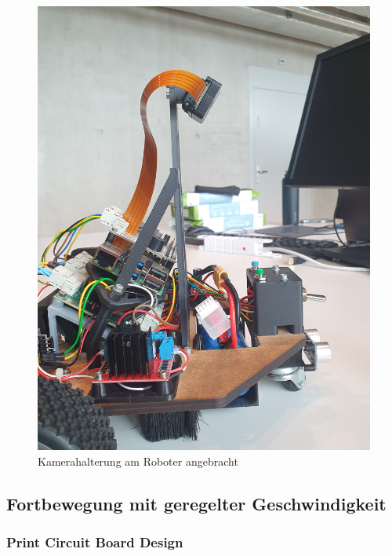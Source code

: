 \begin{figure}[H]
\begin{minipage}[b]{0.58\textwidth}
\end{minipage}
\hfill
\begin{minipage}[b]{0.41\textwidth}
  \centering
  \includegraphics[width=\textwidth, angle=-90]{assets/MT/kamerahalterung.jpg}
  \caption{Kamerahalterung am Roboter angebracht}
  \label{fig:kameraturm-robi}
\end{minipage}
\end{figure}

\subsection{Fortbewegung mit geregelter Geschwindigkeit}

\subsubsection{Print Circuit Board Design}
\label{pcb}

